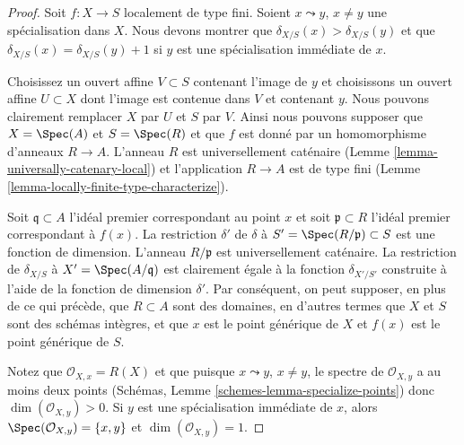 \begin{proof}
Soit $f : X \to S$ localement de type fini.
Soient $x \leadsto y$, $x \not = y$ une spécialisation dans
$X$. Nous devons montrer que $\delta_{X/S}(x) > \delta_{X/S}(y)$ et
que $\delta_{X/S}(x) = \delta_{X/S}(y) + 1$ si $y$ est une spécialisation
immédiate de $x$.

\medskip\noindent Choisissez
un ouvert affine $V \subset S$ contenant l'image de $y$
et choisissons un ouvert affine $U \subset X$ dont l'image est contenue dans $V$
et contenant $y$. Nous pouvons clairement remplacer
$X$ par $U$ et $S$ par $V$.
Ainsi nous pouvons supposer que $X = \Spec(A)$ et $S = \Spec(R)$
et que $f$ est donné par un homomorphisme d'anneaux
$R \to A$. L'anneau $R$ est universellement
caténaire (Lemme \ref{lemma-universally-catenary-local}) et l'application
$R \to A$ est de type fini (Lemme \ref{lemma-locally-finite-type-characterize}).

\medskip\noindent
Soit $\mathfrak q \subset A$ l'idéal premier correspondant au point $x$
et soit $\mathfrak p \subset R$ l'idéal premier correspondant à $f(x)$.
La restriction $\delta'$ de $\delta$ à $S' = \Spec(R/\mathfrak p) \subset S$ est une fonction
de dimension. L'anneau $R/\mathfrak p$ est universellement
caténaire. La restriction de $\delta_{X/S}$ à $X' = \Spec(A/\mathfrak q)$ est
clairement égale à la fonction $\delta_{X'/S'}$ construite à l'aide de
la fonction de dimension $\delta'$. Par conséquent, on peut
supposer, en plus de ce qui précède, que $R \subset A$ sont des
domaines, en d'autres termes que $X$ et $S$ sont
des schémas intègres, et que $x$ est le point générique
de $X$ et $f(x)$ est le point générique de $S$.

\medskip\noindent
Notez que $\mathcal{O}_{X, x} = R(X)$ et que puisque $x \leadsto y$,
$x \not = y$, le spectre de $\mathcal{O}_{X, y}$ a au
moins
deux points (Schémas, Lemme \ref{schemes-lemma-specialize-points})
donc $\dim(\mathcal{O}_{X, y}) > 0$. Si $y$
est une spécialisation immédiate
de $x$, alors $\Spec(\mathcal{O}_{X, y}) = \{x, y\}$
et $\dim(\mathcal{O}_{X, y}) = 1$.


\end{proof}
